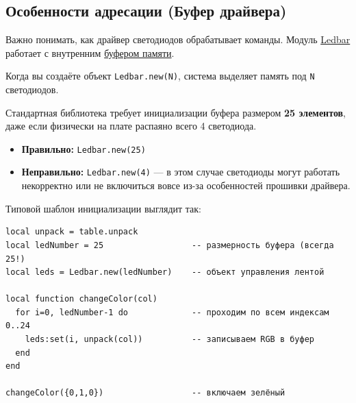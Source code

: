 \subsection{Особенности адресации (Буфер драйвера)}

Важно понимать, как драйвер светодиодов обрабатывает команды. Модуль \hyperlink{term:ledbar}{Ledbar} работает с внутренним \hyperlink{term:buffer}{буфером памяти}.

Когда вы создаёте объект \texttt{Ledbar.new(N)}, система выделяет память под \texttt{N} светодиодов.

\begin{warnbox}
Стандартная библиотека требует инициализации буфера размером \textbf{25 элементов}, даже если физически на плате распаяно всего 4 светодиода.
\begin{itemize}
    \item \textbf{Правильно:} \texttt{Ledbar.new(25)}
    \item \textbf{Неправильно:} \texttt{Ledbar.new(4)} — в этом случае светодиоды могут работать некорректно или не включиться вовсе из-за особенностей прошивки драйвера.
\end{itemize}
\end{warnbox}

Типовой шаблон инициализации выглядит так:

\begin{verbatim}
local unpack = table.unpack
local ledNumber = 25                  -- размерность буфера (всегда 25!)
local leds = Ledbar.new(ledNumber)    -- объект управления лентой

local function changeColor(col)
  for i=0, ledNumber-1 do             -- проходим по всем индексам 0..24
    leds:set(i, unpack(col))          -- записываем RGB в буфер
  end
end

changeColor({0,1,0})                  -- включаем зелёный
\end{verbatim}
